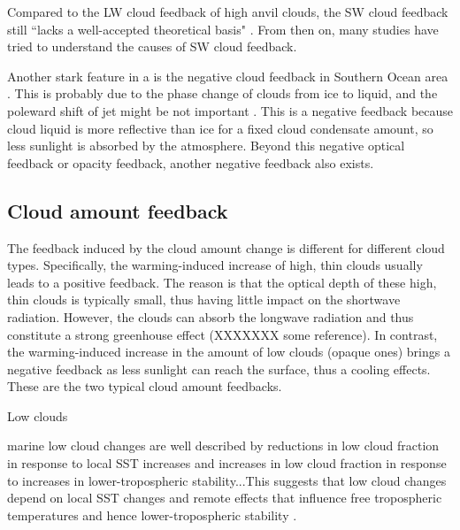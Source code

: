 Compared to the LW cloud feedback of high anvil clouds, the SW cloud feedback still ``lacks a well-accepted theoretical basis" \citep{stocker2013climate}. From then on, many studies have tried to understand the causes of SW cloud feedback. 

Another stark feature in a is the negative cloud feedback in Southern Ocean area \citep[Figure 8 of ][]{Vial2013,Zelinka2012computing}. This is probably due to the phase change of clouds from ice to liquid, and the poleward shift of jet might be not important \citep{Kay2014processes}. This is a negative feedback because cloud liquid is more reflective than ice for a fixed cloud condensate amount, so less sunlight is absorbed by the atmosphere. Beyond this negative optical feedback or opacity feedback, another negative feedback also exists.


\subsection{Cloud amount feedback}
The feedback induced by the cloud amount change is different for different cloud types. Specifically, the warming-induced increase of high, thin clouds usually leads to a positive feedback. The reason is that the optical depth of these high, thin clouds is typically small, thus having little impact on the shortwave radiation. However, the clouds can absorb the longwave radiation and thus constitute a strong greenhouse effect (XXXXXXX some reference). In contrast, the warming-induced increase in the amount of low clouds (opaque ones) brings a negative feedback as less sunlight can reach the surface, thus a cooling effects. These are the two typical cloud amount feedbacks.

Low clouds

marine low cloud changes are well described by reductions in low cloud fraction in response to local SST increases \citep[e.g.,][]{Rieck2012, Webb2013coupling, Qu2014, Bretherton2015, Brient2016,Ceppi2017relationship} and increases in low cloud fraction in response to increases in lower-tropospheric stability...This suggests that low cloud changes depend on local SST changes and remote effects that influence free tropospheric temperatures and hence lower-tropospheric stability \citep[e.g.,][]{Zhou2015,Zhou2016,Zhou2017,Andrews2018}. 

